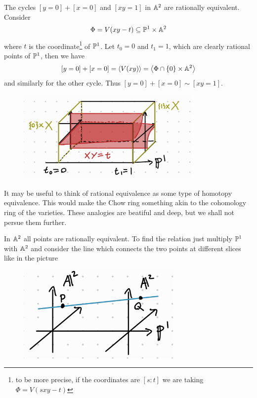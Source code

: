 \begin{example}
The cycles $[y=0]+[x=0]$ and $[xy=1]$ in $\mathbb{A}^2$ are rationally equivalent. Consider 
\[\Phi=V(xy-t)\subseteq \mathbb{P}^1\times \mathbb{A}^2\]
where $t$ is the coordinate\footnote{to be more precise, if the coordinates are $[s:t]$ we are taking $\Phi=V(sxy-t)$} of $\mathbb{P}^1$. Let $t_0=0$ and $t_1=1$, which are clearly rational points of $\mathbb{P}^1$, then we have
\[[y=0]+[x=0]=\left\langle {V(xy)}\right\rangle=\left\langle {\Phi\cap \left\{{0}\right\}\times \mathbb{A}^2}\right\rangle\]
and similarly for the other cycle. Thus $[y=0]+[x=0]\sim [xy=1]$.
\begin{figure}[!htb]
	\centering
	\includegraphics[width=9cm]{Images/rational-equivalence.png}
\end{figure}
\end{example}

\begin{remark}
It may be useful to think of rational equivalence as some type of homotopy equivalence. This would make the Chow ring something akin to the cohomology ring of the varieties. These analogies are beatiful and deep, but we shall not persue them further.
\end{remark}



\begin{example}
In $\mathbb{A}^2$ all points are rationally equivalent. To find the relation just multiply $\mathbb{P}^1$ with $\mathbb{A}^2$ and consider the line which connects the two points at different slices like in the picture
\begin{figure}[!htb]
	\centering
	\includegraphics[width=8cm]{Images/points-in-A2-are-rationally-equivalent.png}
\end{figure}
\end{example}

